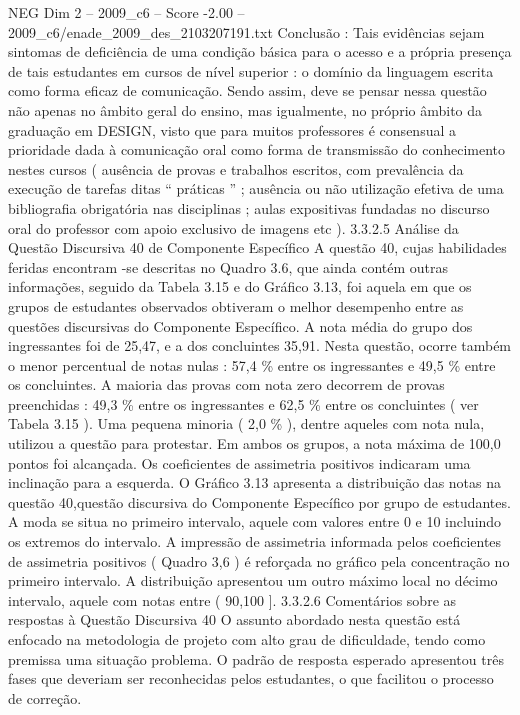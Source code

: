\begin{textsample}{NEG Dim 2 – 2009\_c6 – Score -2.00 – 2009\_c6/enade\_2009\_des\_2103207191.txt}
Conclusão : Tais evidências sejam sintomas de deficiência de uma condição básica para o acesso e a própria presença de tais estudantes em cursos de nível superior : o domínio da linguagem escrita como forma eficaz de comunicação.
Sendo assim, deve se pensar nessa questão não apenas no âmbito geral do ensino, mas igualmente, no próprio âmbito da graduação em DESIGN, visto que para muitos professores é consensual a prioridade dada à comunicação oral como forma de transmissão do conhecimento nestes cursos ( ausência de provas e trabalhos escritos, com prevalência da execução de tarefas ditas “ práticas ” ; ausência ou não utilização efetiva de uma bibliografia obrigatória nas disciplinas ; aulas expositivas fundadas no discurso oral do professor com apoio exclusivo de imagens etc ). 3.3.2.5 Análise da Questão Discursiva 40 de Componente Específico A questão 40, cujas habilidades feridas encontram -se descritas no Quadro 3.6, que ainda contém outras informações, seguido da Tabela 3.15 e do Gráfico 3.13, foi aquela em que os grupos de estudantes observados obtiveram o melhor desempenho entre as questões discursivas do Componente Específico.
A nota média do grupo dos ingressantes foi de 25,47, e a dos concluintes 35,91.
Nesta questão, ocorre também o menor percentual de notas nulas : 57,4 \% entre os ingressantes e 49,5 \% entre os concluintes.
A maioria das provas com nota zero decorrem de provas preenchidas : 49,3 \% entre os ingressantes e 62,5 \% entre os concluintes ( ver Tabela 3.15 ).
Uma pequena minoria ( 2,0 \% ), dentre aqueles com nota nula, utilizou a questão para protestar.
Em ambos os grupos, a nota máxima de 100,0 pontos foi alcançada.
Os coeficientes de assimetria positivos indicaram uma inclinação para a esquerda.
O Gráfico 3.13 apresenta a distribuição das notas na questão 40,questão discursiva do Componente Específico por grupo de estudantes.
A moda se situa no primeiro intervalo, aquele com valores entre 0 e 10 incluindo os extremos do intervalo.
A impressão de assimetria informada pelos coeficientes de assimetria positivos ( Quadro 3,6 ) é reforçada no gráfico pela concentração no primeiro intervalo.
A distribuição apresentou um outro máximo local no décimo intervalo, aquele com notas entre ( 90,100 ]. 3.3.2.6 Comentários sobre as respostas à Questão Discursiva 40 O assunto abordado nesta questão está enfocado na metodologia de projeto com alto grau de dificuldade, tendo como premissa uma situação problema.
O padrão de resposta esperado apresentou três fases que deveriam ser reconhecidas pelos estudantes, o que facilitou o processo de correção.

\end{textsample}
